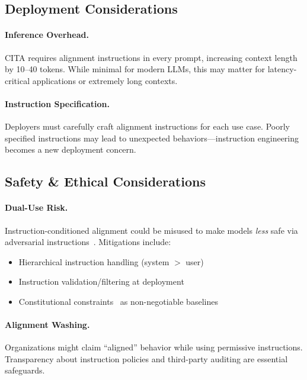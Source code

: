 \subsection{Deployment Considerations}
\label{sec:deployment}

\paragraph{Inference Overhead.} CITA requires alignment instructions in every prompt, increasing context length by 10--40 tokens. While minimal for modern LLMs, this may matter for latency-critical applications or extremely long contexts.

\paragraph{Instruction Specification.} Deployers must carefully craft alignment instructions for each use case. Poorly specified instructions may lead to unexpected behaviors---instruction engineering becomes a new deployment concern.

\vspace{-2mm}
\subsection{Safety \& Ethical Considerations}
\label{sec:safety_ethics}

\paragraph{Dual-Use Risk.} Instruction-conditioned alignment could be misused to make models \textit{less} safe via adversarial instructions~\cite{zou2023universal,carlini2023aligned,pace2024west}. Mitigations include:
\begin{itemize}[leftmargin=*,itemsep=1pt]
    \item Hierarchical instruction handling (system $>$ user)
    \item Instruction validation/filtering at deployment
    \item Constitutional constraints~\cite{bai2022constitutional} as non-negotiable baselines
\end{itemize}

\paragraph{Alignment Washing.} Organizations might claim ``aligned'' behavior while using permissive instructions. Transparency about instruction policies and third-party auditing are essential safeguards.

